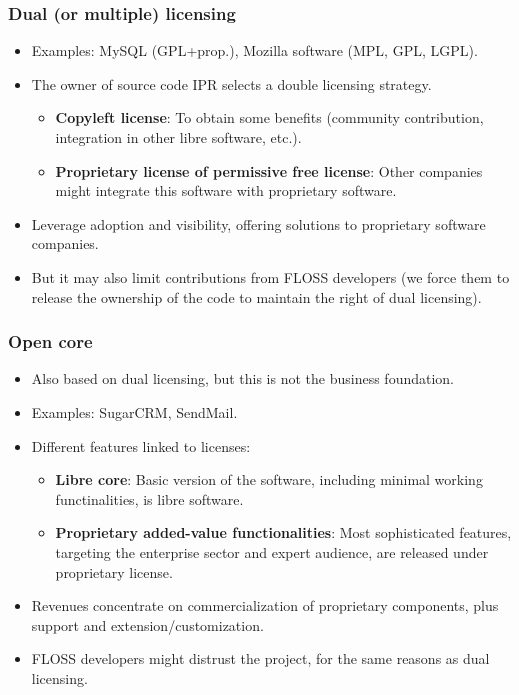 \begin{frame}
 \frametitle{Dual (or multiple) licensing}
 \begin{itemize}
  \item Examples: MySQL (GPL+prop.), Mozilla software (MPL, GPL, LGPL).
  \item The owner of source code IPR selects a double licensing strategy.
  \begin{itemize}
   \item \textbf{Copyleft license}: To obtain some benefits (community contribution, integration in other libre software, etc.).
   \item \textbf{Proprietary license of permissive free license}: Other companies might integrate this software with
   proprietary software.
  \end{itemize}  
  \item Leverage adoption and visibility, offering solutions to proprietary software companies.
  \item But it may also limit contributions from FLOSS developers (we force them to release the ownership  of the code
  to maintain the right of dual licensing).
 \end{itemize}
\end{frame}

\begin{frame}
 \frametitle{Open core}
 \begin{itemize}
  \item Also based on dual licensing, but this is not the business foundation.
  \item Examples: SugarCRM, SendMail.
  \item Different features linked to licenses:
  \begin{itemize}
   \item \textbf{Libre core}: Basic version of the software, including minimal working functinalities,
   is libre software.
   \item \textbf{Proprietary added-value functionalities}: Most sophisticated features, targeting the
   enterprise sector and expert audience, are released under proprietary license.
  \end{itemize}  
  \item Revenues concentrate on commercialization of proprietary components, plus support and
  extension/customization.
  \item FLOSS developers might distrust the project, for the same reasons as dual licensing.
 \end{itemize}
\end{frame}

